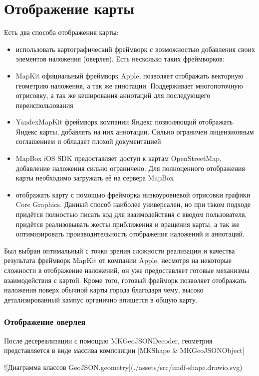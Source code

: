   \section{Отображение карты}
    Есть два способа отображения карты:
    \begin{itemize}
      \item использовать картографический фреймворк с возможностью добавления своих элементов наложения (оверлея). Есть несколько таких фреймворков:
      \item MapKit официальный фреймворк Apple, позволяет отображать векторную геометрию наложения, а так же аннотации. Поддерживает многопоточную отрисовку, а так же кеширования аннотаций для последующего переиспользования
      \item YandexMapKit фреймворк компании Яндекс позволяющий отображать Яндекс карты, добавлять на них аннотации. Сильно ограничен лицензионным соглашением и обладает плохой документацией
      \item MapBox iOS SDK предоставляет доступ к картам OpenStreetMap, добавление наложения сильно ограничено. Для полноценного отображения карты необходимо загружать её на сервера MapBox
      \item отображать карту с помощью фрейморка низкоуровневой отрисовки графики Core Graphics. Данный способ наиболее универсален, но при таком подходе придётся полностью писать код для взаимодействия с вводом пользователя, придётся реализовывать жесты приближения и вращения карты, а так же оптимизировать производительность отображения наложений и аннотаций.
    \end{itemize}


    Был выбран оптимальный с точки зрения сложности реализации и качества результата фреймворк MapKit от компании Apple, несмотря на некоторые сложности в отображение наложений, он уже предоставляет готовые механизмы взаимодействия с картой. Кроме того, готовый фрейморк позволяет отображать наложения поверх обычной карты города благодаря чему, высоко детализированный кампус органично впишется в общую карту.

    \subsubsection{Отображение оверлея}
      После десереализации с помощью MKGeoJSONDecoder, геометрия представляется в виде массива композиции [MKShape \& MKGeoJSONObject]

      ![Диаграмма классов GeoJSON.geometry](./assets/src/imdf-shape.drawio.svg)

